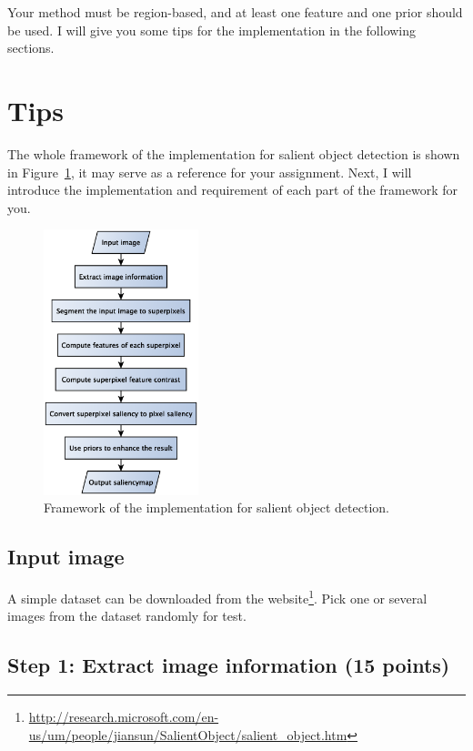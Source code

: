 \documentclass[12pt]{article}
\begin{document}
Your method must be region-based, and at least one feature and one prior should be used. I will give you some tips for the implementation in the following sections.

\section{Tips}

The whole framework of the implementation for salient object detection is shown in Figure~\ref{fig: framework}, it may serve as a reference for your assignment. Next, I will introduce the implementation and requirement of each part of the framework for you.

\begin{figure}[!ht]
\centering
\includegraphics[width=0.4\textwidth]{framework.eps}
\caption{Framework of the implementation for salient object detection.}
\label{fig: framework}
\end{figure}

\subsection{Input image}

A simple dataset can be downloaded from the website\footnote{\url{http://research.microsoft.com/en-us/um/people/jiansun/SalientObject/salient_object.htm}}. Pick one or several images from the dataset randomly for test.

\subsection{Step 1: Extract image information (15 points)}
\end{document}
